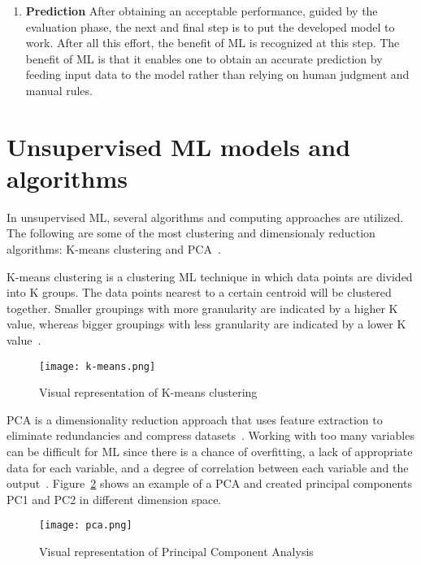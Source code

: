 \begin{enumerate}
    \item \textbf{Prediction} After obtaining an acceptable performance, guided by the evaluation phase, the next and final step is to put the developed model to work. After all this effort, the benefit of \gls{ML} is recognized at this step. The benefit of \gls{ML} is that it enables one to obtain an accurate prediction by feeding input data to the model rather than relying on human judgment and manual rules.

\end{enumerate}

\section{Unsupervised ML models and algorithms}

In unsupervised \gls{ML}, several algorithms and computing approaches are utilized. The following are some of the most clustering and dimensionaly reduction algorithms: K-means clustering and \gls{PCA}~\cite{Chugh2018TypesKnow}.

K-means clustering is a clustering \gls{ML} technique in which data points are divided into K groups. The data points nearest to a certain centroid will be clustered together. Smaller groupings with more granularity are indicated by a higher K value, whereas bigger groupings with less granularity are indicated by a lower K value~\cite{2020WhatIBMb}.
    
\begin{figure}[htbp]
    \centering
    \texttt{[image: k-means.png]}
    \caption{Visual representation of K-means clustering~\cite{Beaumont2020ImageMedium}}
    \label{fig:k-means}
\end{figure}

\gls{PCA} is a dimensionality reduction approach that uses feature extraction to eliminate redundancies and compress datasets~\cite{2020WhatIBMb}. Working with too many variables can be difficult for \gls{ML} since there is a chance of overfitting, a lack of appropriate data for each variable, and a degree of correlation between each variable and the output~\cite{Chugh2018TypesKnow}. Figure~\ref{fig:pca} shows an example of a \gls{PCA} and created principal components PC1 and PC2 in different dimension space.

\begin{figure}[htbp]
    \centering
    \texttt{[image: pca.png]}
    \caption{Visual representation of Principal Component Analysis~\cite{Sah2020MachineTypes}}
    \label{fig:pca}
\end{figure}


